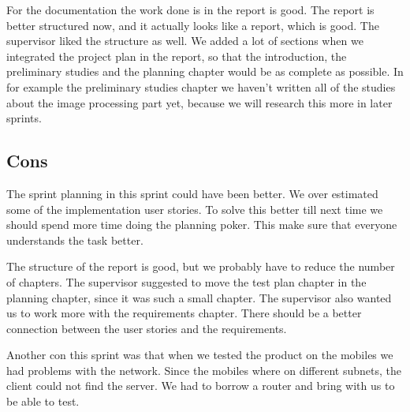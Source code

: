 For the documentation the work done is in the report is good. The report is better structured now, and it actually looks like a report, which is good. The supervisor liked the structure as well. We added a lot of sections when we integrated the project plan in the report, so that the introduction, the preliminary studies and the planning chapter would be as complete as possible. In for example the preliminary studies chapter we haven't written all of the studies about the image processing part yet, because we will research this more in later sprints.

\subsection{Cons}
The sprint planning in this sprint could have been better. We over estimated some of the implementation user stories. To solve this better till next time we should spend more time doing the planning poker. This make sure that everyone understands the task better. 

The structure of the report is good, but we probably have to reduce the number of chapters. The supervisor suggested to move the test plan chapter in the planning chapter, since it was such a small chapter. The supervisor also wanted us to work more with the requirements chapter. There should be a better connection between the user stories and the requirements.


Another con this sprint was that when we tested the product on the mobiles we had problems with the network. Since the mobiles where on different subnets, the client could not find the server. We had to borrow a router and bring with us to be able to test. 